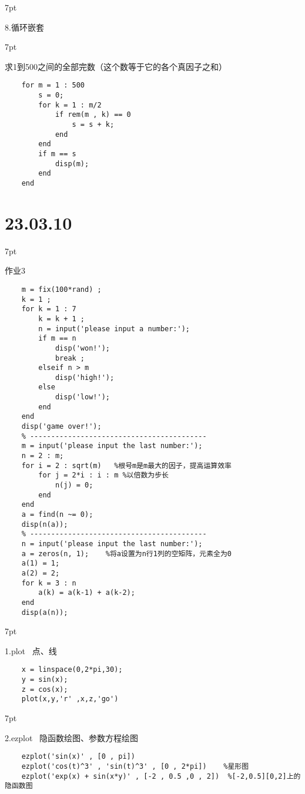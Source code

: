 \documentclass{article} %
\newenvironment{eg}{%
\def\FrameCommand{%
\hspace{1pt}%
{\color{Gray}\vrule width 2pt}%
{\color{egshade}\vrule width 4pt}%
\colorbox{egshade}%
}%
\MakeFramed{\advance\hsize-\width\FrameRestore}%
\noindent\hspace{-4.55pt}%
\begin{adjustwidth}{}{7pt}%
\vspace{2pt}\vspace{2pt}%
\normalfont %
}
{%
\vspace{2pt}\end{adjustwidth}\endMakeFramed%
}
\newenvironment{wa}{%
\def\FrameCommand{%
\hspace{1pt}%
{\color{LightCoral}\vrule width 2pt}%
{\color{washade}\vrule width 4pt}%
\colorbox{washade}%
}%
\MakeFramed{\advance\hsize-\width\FrameRestore}%
\noindent\hspace{-4.55pt}%
\begin{adjustwidth}{}{7pt}%
\vspace{2pt}\vspace{2pt}%
\normalfont %
}
{%
\vspace{2pt}\end{adjustwidth}\endMakeFramed%
}
\begin{document}
\begin{eg}
    8.循环嵌套
\end{eg}
\begin{wa}
    求1到500之间的全部完数（这个数等于它的各个真因子之和）
\end{wa}
\begin{lstlisting}
    for m = 1 : 500
        s = 0;
        for k = 1 : m/2
            if rem(m , k) == 0
                s = s + k;
            end
        end
        if m == s
            disp(m);
        end
    end
\end{lstlisting}


\newpage
\noindent \Large \section*{23.03.10} \par \normalsize
\begin{wa}
    作业3
\end{wa}
\begin{lstlisting}
    m = fix(100*rand) ;
    k = 1 ;
    for k = 1 : 7 
        k = k + 1 ;
        n = input('please input a number:');
        if m == n
            disp('won!');
            break ;
        elseif n > m
            disp('high!');
        else
            disp('low!');
        end
    end
    disp('game over!');
    % ------------------------------------------
    m = input('please input the last number:');
    n = 2 : m;
    for i = 2 : sqrt(m)   %根号m是m最大的因子，提高运算效率
        for j = 2*i : i : m %以倍数为步长
            n(j) = 0;
        end
    end
    a = find(n ~= 0);
    disp(n(a));
    % ------------------------------------------
    n = input('please input the last number:');
    a = zeros(n, 1);    %将a设置为n行1列的空矩阵，元素全为0
    a(1) = 1;
    a(2) = 2;
    for k = 3 : n
        a(k) = a(k-1) + a(k-2);
    end
    disp(a(n));
\end{lstlisting}
\begin{eg}
    1.plot \ 点、线
\end{eg}
\begin{lstlisting}
    x = linspace(0,2*pi,30);
    y = sin(x);
    z = cos(x);
    plot(x,y,'r' ,x,z,'go')
\end{lstlisting}

\begin{eg}
    2.ezplot \ 隐函数绘图、参数方程绘图
\end{eg}
\begin{lstlisting}
    ezplot('sin(x)' , [0 , pi])
    ezplot('cos(t)^3' , 'sin(t)^3' , [0 , 2*pi])    %星形图
    ezplot('exp(x) + sin(x*y)' , [-2 , 0.5 ,0 , 2])  %[-2,0.5][0,2]上的隐函数图
\end{lstlisting}
\end{document}

